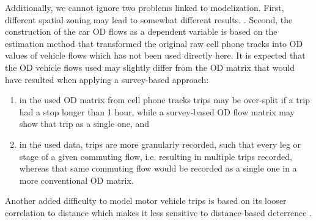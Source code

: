 Additionally, we cannot ignore two problems linked to modelization. First, different spatial zoning may lead to somewhat different results.  \citep{LeSage2010SpatialFlows}. Second, the construction of the car OD flows as a dependent variable is based on the estimation method that transformed the original raw cell phone tracks into OD values of vehicle flows \citep{Calvet2020ObtencioM2019} which has not been used directly here. It is expected that the OD vehicle flows used may slightly differ from the OD matrix that would have resulted when applying a survey-based approach: 
\begin{enumerate}
    \item in the used OD matrix from cell phone tracks trips may be over-split if a trip had a stop longer than 1 hour, while a survey-based OD flow matrix may show that trip as a single one, and 
    \item in the used data, trips are more granularly recorded, such that every leg or stage of a given commuting flow, i.e. %
   resulting in multiple trips recorded, whereas that same commuting flow would be recorded as a single one in a more conventional OD matrix. 
\end{enumerate}

Another added difficulty to model motor vehicle trips is based on its looser correlation to distance which makes it less sensitive to distance-based deterrence \citep{PerezSans2021}. 


